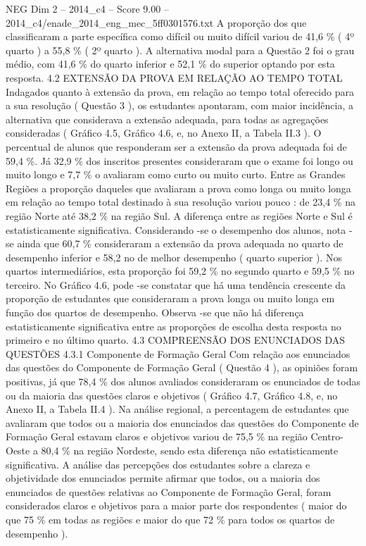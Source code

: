 \begin{textsample}{NEG Dim 2 – 2014\_c4 – Score 9.00 – 2014\_c4/enade\_2014\_eng\_mec\_5ff0301576.txt}
A proporção dos que classificaram a parte específica como difícil ou muito difícil variou de 41,6 \% ( 4º quarto ) a 55,8 \% ( 2º quarto ).
A alternativa modal para a Questão 2 foi o grau médio, com 41,6 \% do quarto inferior e 52,1 \% do superior optando por esta resposta. 4.2 EXTENSÃO DA PROVA EM RELAÇÃO AO TEMPO TOTAL Indagados quanto à extensão da prova, em relação ao tempo total oferecido para a sua resolução ( Questão 3 ), os estudantes apontaram, com maior incidência, a alternativa que considerava a extensão adequada, para todas as agregações consideradas ( Gráfico 4.5, Gráfico 4.6, e, no Anexo II, a Tabela II.3 ).
O percentual de alunos que responderam ser a extensão da prova adequada foi de 59,4 \%.
Já 32,9 \% dos inscritos presentes consideraram que o exame foi longo ou muito longo e 7,7 \% o avaliaram como curto ou muito curto.
Entre as Grandes Regiões a proporção daqueles que avaliaram a prova como longa ou muito longa em relação ao tempo total destinado à sua resolução variou pouco : de 23,4 \% na região Norte até 38,2 \% na região Sul.
A diferença entre as regiões Norte e Sul é estatisticamente significativa.
Considerando -se o desempenho dos alunos, nota -se ainda que 60,7 \% consideraram a extensão da prova adequada no quarto de desempenho inferior e 58,2 no de melhor desempenho ( quarto superior ).
Nos quartos intermediários, esta proporção foi 59,2 \% no segundo quarto e 59,5 \% no terceiro.
No Gráfico 4.6, pode -se constatar que há uma tendência crescente da proporção de estudantes que consideraram a prova longa ou muito longa em função dos quartos de desempenho.
Observa -se que não há diferença estatisticamente significativa entre as proporções de escolha desta resposta no primeiro e no último quarto. 4.3 COMPREENSÃO DOS ENUNCIADOS DAS QUESTÕES 4.3.1 Componente de Formação Geral Com relação aos enunciados das questões do Componente de Formação Geral ( Questão 4 ), as opiniões foram positivas, já que 78,4 \% dos alunos avaliados consideraram os enunciados de todas ou da maioria das questões claros e objetivos ( Gráfico 4.7, Gráfico 4.8, e, no Anexo II, a Tabela II.4 ).
Na análise regional, a percentagem de estudantes que avaliaram que todos ou a maioria dos enunciados das questões do Componente de Formação Geral estavam claros e objetivos variou de 75,5 \% na região Centro-Oeste a 80,4 \% na região Nordeste, sendo esta diferença não estatisticamente significativa.
A análise das percepções dos estudantes sobre a clareza e objetividade dos enunciados permite afirmar que todos, ou a maioria dos enunciados de questões relativas ao Componente de Formação Geral, foram considerados claros e objetivos para a maior parte dos respondentes ( maior do que 75 \% em todas as regiões e maior do que 72 \% para todos os quartos de desempenho ).

\end{textsample}
